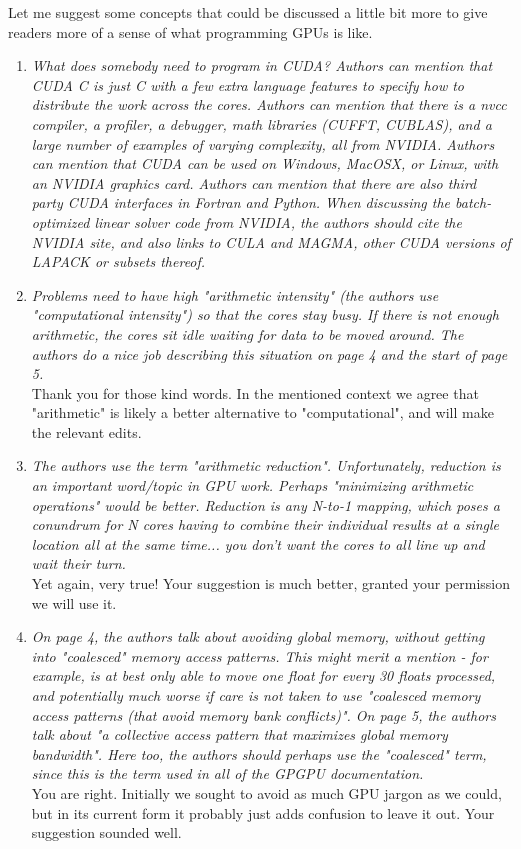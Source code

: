 \documentclass[11pt]{article} %
\newcommand\1{\vec 1}
\newcommand\q[1]{\textit{#1}}
\newcommand\qi[1]{\item\q{#1}}
\newcommand\ans[1]{#1}
\newcommand\ai[1]{\\[.5\baselineskip]\ans{#1}}
\begin{document}
Let me suggest some concepts that could be discussed a little bit more to give readers more of a sense of what programming GPUs is like.

\begin{enumerate}
\qi{What does somebody need to program in CUDA? Authors can mention that CUDA C is just C with a few extra language features to specify how to distribute the work across the cores. Authors can mention that there is a nvcc compiler, a profiler, a debugger, math libraries (CUFFT, CUBLAS), and a large number of examples of varying complexity, all from NVIDIA. Authors can mention that CUDA can be used on Windows, MacOSX, or Linux, with an NVIDIA graphics card. Authors can mention that there are also third party CUDA interfaces in Fortran and Python. When discussing the batch-optimized linear solver code from NVIDIA, the authors should cite the NVIDIA site, and also links to CULA and MAGMA, other CUDA versions of LAPACK or subsets thereof.}
\qi{Problems need to have high "arithmetic intensity" (the authors use "computational intensity") so that the cores stay busy. If there is not enough arithmetic, the cores sit idle waiting for data to be moved around. The authors do a nice job describing this situation on page 4 and the start of page 5.}
\ai{Thank you for those kind words. In the mentioned context we agree that "arithmetic" is likely a better alternative to "computational", and will make the relevant edits.}
%
\qi{The authors use the term "arithmetic reduction". Unfortunately, reduction is an important word/topic in GPU work. Perhaps "minimizing arithmetic operations" would be better. Reduction is any N-to-1 mapping, which poses a conundrum for N cores having to combine their individual results at a single location all at the same time... you don't want the cores to all line up and wait their turn.}
\ai{Yet again, very true! Your suggestion is much better, granted your permission we will use it.}
%
\qi{On page 4, the authors talk about avoiding global memory, without getting into "coalesced" memory access patterns. This might merit a mention - for example, is at best only able to move one float for every 30 floats processed, and potentially much worse if care is not taken to use "coalesced memory access patterns (that avoid memory bank conflicts)". On page 5, the authors talk about "a collective access pattern that maximizes global memory bandwidth". Here too, the authors should perhaps use the "coalesced" term, since this is the term used in all of the GPGPU documentation.}
\ai{You are right. Initially we sought to avoid as much GPU jargon as we could, but in its current form it probably just adds confusion to leave it out. Your suggestion sounded well.}
\end{enumerate}
\end{document}
